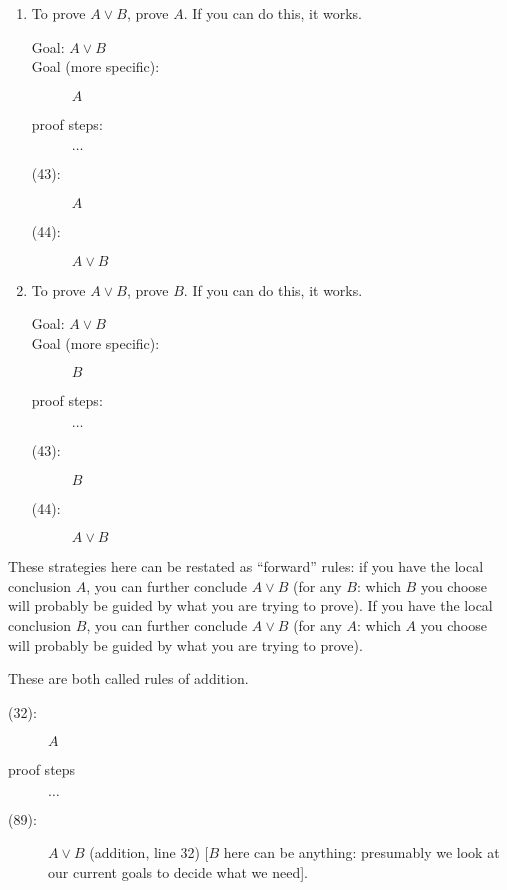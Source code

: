 \documentclass[12pt]{article}
\begin{document}
\begin{enumerate}

\item  To prove $A \vee B$, prove $A$.  If you can do this, it works.

\begin{description}

\item[Goal: $A \vee B$]

\item[Goal (more specific):]  $A$

\item[proof steps:] $\ldots$

\item[(43):]  $A$

\item[(44):]  $A \vee B$

\end{description}

\item  To prove $A \vee B$, prove $B$.  If you can do this, it works.

\begin{description}

\item[Goal: $A \vee B$]

\item[Goal (more specific):]  $B$

\item[proof steps:] $\ldots$

\item[(43):]  $B$

\item[(44):]  $A \vee B$

\end{description}

\end{enumerate}



These strategies here can be restated as ``forward'' rules:
if you have the local conclusion $A$, you can further conclude $A \vee B$ (for any $B$:  which $B$ you choose will probably be guided by what you are trying to prove).
If you have the local conclusion $B$, you can further conclude $A \vee B$ (for any $A$:  which $A$ you choose will probably be guided by what you are trying to prove).

These are both called rules of addition.

\newpage

\begin{description}

\item[(32):]  $A$

\item[proof steps] $\ldots$ 

\item[(89):] $A \vee B$  (addition, line 32)  [$B$ here can be anything:  presumably we look at our current goals to decide what we need].




\end{description}
\end{document}
